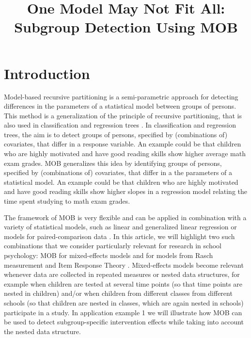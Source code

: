 \documentclass[doc,floatsintext,natbib]{apa7}
\title{One Model May Not Fit All: Subgroup Detection Using MOB}
\begin{document}

\renewenvironment{Schunk}{\small}{}


\maketitle



\newpage
\section{Introduction}
\label{sec:Introduction}

Model-based recursive partitioning \citep[MOB,][]{ZeilyHoth08} is a semi-parametric approach for detecting differences in the parameters of a statistical
model between groups of persons. This method is a generalization of the principle of recursive partitioning, that is also used in classification and regression trees \citep{Breetal:1984}. 
In classification and regression trees, the aim is to detect groups of persons, specified by (combinations of) covariates, that differ in a response variable. An example could be that children who are highly motivated and have good reading skills show higher average math exam grades. 
MOB generalizes this idea by identifying groups of persons, specified by (combinations of) covariates, that differ in a the parameters of a statistical model. An example could be that children who are highly motivated and have good reading skills show higher slopes in a regression model relating the time spent studying to math exam grades. 

The framework of MOB is very flexible and can be applied in combination with a variety of statistical models, such as linear and generalized linear regression \citep{KopAugStr:2013,ZeilyHoth08} or models for paired-comparison data \citep{StrWicZei:2011:JoEaBS}. In this article, we will highlight two such combinations that we consider particularly relevant for research in school psychology: MOB for mixed-effects models \citep{FokkySmit18} and for models from Rasch measurement and Item Response Theory \citep[IRT,][]{StrKopZei:2015:P,KomStrZei:2017:EaPM,HenDebStr:2023:EPM}. Mixed-effects models become relevant whenever data are collected in repeated measures or nested data structures, for example when children are tested at several time points (so that time points are nested in children) and/or when children from different classes from different schools (so that children are nested in classes, which are again nested in schools) participate in a study. In application example 1 we will illustrate how MOB can be used to detect subgroup-specific intervention effects while taking into account the nested data structure. 
\end{document}
